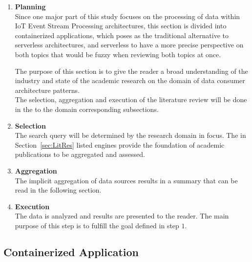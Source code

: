 \begin{enumerate}[label={}]
    \item
    \textbf{Planning}\\
    Since one major part of this study focuses on the processing of data within IoT Event Stream Processing architectures, this section is divided into containerized applications, which poses as the traditional alternative to serverless architectures, and serverless to have a more precise perspective on both topics that would be fuzzy when reviewing both topics at once.
    
    The purpose of this section is to give the reader a broad understanding of the industry and state of the academic research on the domain of data consumer architecture patterns. \\
    The selection, aggregation and execution of the literature review will be done in the to the domain corresponding subsections. 
    
    \item
    \textbf{Selection}\\
    The search query will be determined by the research domain in focus. The in Section~\vref{sec:LitRes} listed engines provide the foundation of academic publications to be aggregated and assessed. 
    
    \item
    \textbf{Aggregation}\\
    The implicit aggregation of data sources results in a summary that can be read in the following section.
    
    \item
    \textbf{Execution}\\
    The data is analyzed and results are presented to the reader. The main purpose of this step is to fulfill the goal defined in step $1$.
    
\end{enumerate}

\subsection{Containerized Application}\label{chp:container}


